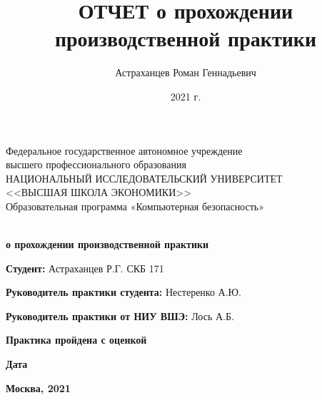 \documentclass[a4paper,12pt]{article}
\author{Астраханцев Роман Геннадьевич}
\title{ОТЧЕТ о прохождении производственной практики}
\date{2021 г.}
\theoremstyle{definition}
\begin{document}
	
	\thispagestyle{empty}
	\begin{center}
		Федеральное государственное автономное учреждение \\ высшего профессионального образования \\

		НАЦИОНАЛЬНЫЙ ИССЛЕДОВАТЕЛЬСКИЙ УНИВЕРСИТЕТ \\ <<ВЫСШАЯ ШКОЛА ЭКОНОМИКИ>> \\
		\vspace{2ex}
		Образовательная программа «Компьютерная безопасность» \\
	\end{center}

	\begin{center}
		\vspace{15ex}
		\textbf{ \\ о прохождении производственной практики}
	\end{center}

	\vspace{10ex}

	\textbf{Студент:} Астраханцев Р.Г. СКБ 171 \underline{\hspace{5em} \vspace{-1mm}} 
		
	\textbf{Руководитель практики студента:} Нестеренко А.Ю. \underline{\hspace{5em} \vspace{-1mm}}  
		
	\textbf{Руководитель практики от НИУ ВШЭ:} Лось А.Б. \underline{\hspace{5em}  \vspace{-1mm}} 

	\vspace{8ex}
	\hspace{0.3\linewidth} \textbf{Практика пройдена с оценкой \underline{\hspace{3em} \vspace{-1mm}} }

	\vspace{5ex}
	\hspace{0.3\linewidth} \textbf{Дата \underline{\hspace{8em} \vspace{-1mm}} }

	\begin{center}
		
		\vfill
		\textbf{Москва, 2021}
	\end{center}
	
\end{document}
